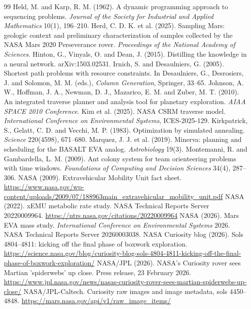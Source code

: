 \documentclass[11pt,a4paper]{article}
\begin{document}
\begin{thebibliography}{99}
 Held, M. and Karp, R. M. (1962). A dynamic programming approach to sequencing problems. \emph{Journal of the Society for Industrial and Applied Mathematics} 10(1), 196--210.
 Herd, C. D. K. et al. (2025). Sampling Mars: geologic context and preliminary characterization of samples collected by the NASA Mars 2020 Perseverance rover. \emph{Proceedings of the National Academy of Sciences}.
 Hinton, G., Vinyals, O. and Dean, J. (2015). Distilling the knowledge in a neural network. arXiv:1503.02531.
 Irnich, S. and Desaulniers, G. (2005). Shortest path problems with resource constraints. In Desaulniers, G., Desrosiers, J. and Solomon, M. M. (eds.), \emph{Column Generation}, Springer, 33--65.
 Johnson, A. W., Hoffman, J. A., Newman, D. J., Mazarico, E. M. and Zuber, M. T. (2010). An integrated traverse planner and analysis tool for planetary exploration. \emph{AIAA SPACE 2010 Conference}.
 Kim et al. (2025). NASA CSRM traverse model. \emph{International Conference on Environmental Systems}, ICES-2025-129.
 Kirkpatrick, S., Gelatt, C. D. and Vecchi, M. P. (1983). Optimization by simulated annealing. \emph{Science} 220(4598), 671--680.
 Marquez, J. J. et al. (2019). Minerva: planning and scheduling for the BASALT EVA analog. \emph{Astrobiology} 19(3).
 Montemanni, R. and Gambardella, L. M. (2009). Ant colony system for team orienteering problems with time windows. \emph{Foundations of Computing and Decision Sciences} 34(4), 287--306.
 NASA (2009). Extravehicular Mobility Unit fact sheet. \url{https://www.nasa.gov/wp-content/uploads/2009/07/188963main_extravehicular_mobility_unit.pdf}
 NASA (2022). xEMU metabolic rate study. NASA Technical Reports Server 20220009964. \url{https://ntrs.nasa.gov/citations/20220009964}
 NASA (2026). Mars EVA mass study. \emph{International Conference on Environmental Systems} 2026. NASA Technical Reports Server 20260003038.
 NASA Curiosity blog (2026). Sols 4804--4811: kicking off the final phase of boxwork exploration. \url{https://science.nasa.gov/blog/curiosity-blog-sols-4804-4811-kicking-off-the-final-phase-of-boxwork-exploration/}
 NASA/JPL (2026). NASA's Curiosity rover sees Martian 'spiderwebs' up close. Press release, 23 February 2026. \url{https://www.jpl.nasa.gov/news/nasas-curiosity-rover-sees-martian-spiderwebs-up-close/}
 NASA/JPL-Caltech. Curiosity raw images and image metadata, sols 4450--4848. \url{https://mars.nasa.gov/api/v1/raw_image_items/}

\end{thebibliography}
\end{document}
